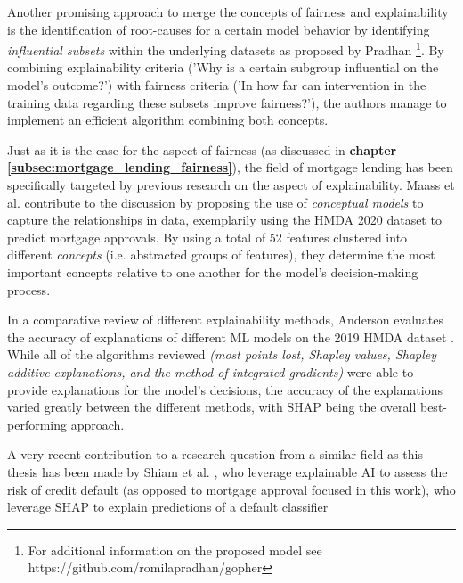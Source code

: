 




Another promising approach to merge the concepts of fairness and explainability is the identification of root-causes for a certain model behavior by identifying \textit{influential subsets} within the underlying datasets as proposed by Pradhan \parencite{Pradhan2022}\footnote{For additional information on the proposed model see https://github.com/romilapradhan/gopher}.
By combining explainability criteria ('Why is a certain subgroup influential on the model's outcome?') with fairness criteria ('In how far can intervention in the training data regarding these subsets improve fairness?'), the authors manage to implement an efficient algorithm combining both concepts.

Just as it is the case for the aspect of fairness (as discussed in \textbf{chapter \ref{subsec:mortgage_lending_fairness}}), the field of mortgage lending has been specifically targeted by previous research on the aspect of explainability.
Maass et al. \parencite{Maass2022} contribute to the discussion by proposing the use of \textit{conceptual models} to capture the relationships in data, exemplarily using the HMDA 2020 dataset to predict mortgage approvals.
By using a total of 52 features clustered into different \textit{concepts} (i.e. abstracted groups of features), they determine the most important concepts relative to one another for the model's decision-making process.

In a comparative review of different explainability methods, Anderson evaluates the accuracy of explanations of different ML models on the 2019 HMDA dataset \parencite{Anderson2023}.
While all of the algorithms reviewed \textit{(most points lost, Shapley values, Shapley additive explanations, and the method of integrated gradients)} were able to provide explanations for the model's decisions, the accuracy of the explanations varied greatly between the different methods, with SHAP being the overall best-performing approach.

A very recent contribution to a research question from a similar field as this thesis has been made by Shiam et al. \parencite{Shiam2024}, who leverage explainable AI to assess the risk of credit default (as opposed to mortgage approval focused in this work), who leverage SHAP to explain predictions of a default classifier



